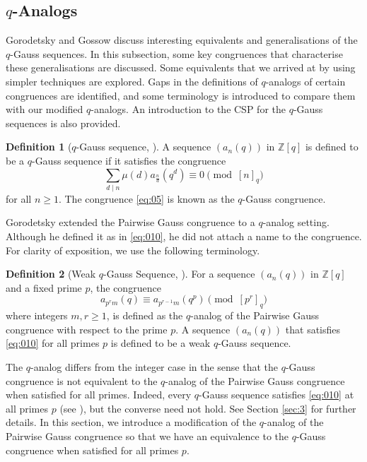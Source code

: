 \documentclass{article}
\numberwithin{equation}{section}
\theoremstyle{definition}
\newtheorem{definition}{\bf {Definition}}[section]
\begin{document}
\subsection{\texorpdfstring{$q$}{q}-Analogs}
Gorodetsky \cite{goro_q-gauss} and Gossow \cite{fern_gauss} discuss interesting equivalents and generalisations of the $q$-Gauss sequences. In this subsection, some key congruences that characterise these generalisations are discussed. Some equivalents that we arrived at by using simpler techniques are explored. Gaps in the definitions of $q$-analogs of certain congruences are identified, and some terminology is introduced to compare them with our modified $q$-analogs. An introduction to the CSP for the $q$-Gauss sequences is also provided.
\begin{definition}[$q$-Gauss sequence, \cite{goro_q-gauss}]
    A sequence $(a_n(q))$ in $\mathbb{Z}[q]$ is defined to be a $q$-Gauss sequence if  it satisfies the congruence 
    \begin{equation}\label{eq:05}
        \sum_{d\mid n}\mu(d)a_\frac{n}{d}(q^d)\equiv0\pmod{[n]_q}
    \end{equation}
    for all $n\geq1$. The congruence \eqref{eq:05} is known as the $q$-Gauss congruence.  
    
\end{definition}
Gorodetsky extended the Pairwise Gauss congruence to a $q$-analog setting. Although he defined it as in \eqref{eq:010}, he did not attach a name to the congruence.  For clarity of exposition, we use the following terminology.
\begin{definition}[Weak $q$-Gauss Sequence, \cite{goro_q-gauss}]
    For a sequence $(a_n(q))$ in $\mathbb{Z}[q]$ and a fixed prime $p$, the congruence 
    \begin{equation}\label{eq:010}
        a_{p^rm}(q)\equiv a_{p^{r-1}m}(q^p)\pmod{[p^r]_q}
    \end{equation}
    where integers $m,r\geq1$, is defined as the $q$-analog of the Pairwise Gauss congruence with respect to the prime $p$. A sequence $(a_n(q))$ that satisfies \eqref{eq:010} for all primes $p$ is defined to be a weak $q$-Gauss sequence.     
\end{definition}

The $q$-analog differs from the integer case in the sense that the $q$-Gauss congruence is not equivalent to the $q$-analog of the Pairwise Gauss congruence when satisfied for all primes. Indeed, every $q$-Gauss sequence satisfies \eqref{eq:010} at all primes $p$ (see \cite[Lemma 2.2]{goro_q-gauss}), but the converse need not hold. See Section \ref{sec:3} for further details. In this section, we introduce a modification of the $q$-analog of the Pairwise Gauss congruence so that we have an equivalence to the $q$-Gauss congruence when satisfied for all primes $p$.   
\end{document}
